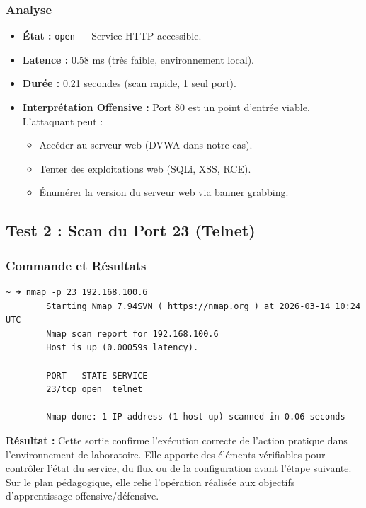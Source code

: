 \documentclass[12pt,a4paper,openany]{report}
\begin{document}
	
	\subsubsection{Analyse}
	\begin{itemize}
		\item \textbf{État :} \texttt{open} --- Service HTTP accessible.
		\item \textbf{Latence :} 0.58 ms (très faible, environnement local).
		\item \textbf{Durée :} 0.21 secondes (scan rapide, 1 seul port).
		\item \textbf{Interprétation Offensive :} Port 80 est un point d'entrée viable. L'attaquant peut :
		\begin{itemize}
			\item Accéder au serveur web (DVWA dans notre cas).
			\item Tenter des exploitations web (SQLi, XSS, RCE).
			\item Énumérer la version du serveur web via banner grabbing.
		\end{itemize}
	\end{itemize}
	
	\subsection{Test 2 : Scan du Port 23 (Telnet)}
	\subsubsection{Commande et Résultats}
	\begin{lstlisting}[caption=Scan Nmap du port Telnet]
		~ ➜ nmap -p 23 192.168.100.6
		Starting Nmap 7.94SVN ( https://nmap.org ) at 2026-03-14 10:24 UTC
		Nmap scan report for 192.168.100.6
		Host is up (0.00059s latency).
		
		PORT   STATE SERVICE
		23/tcp open  telnet
		
		Nmap done: 1 IP address (1 host up) scanned in 0.06 seconds
	\end{lstlisting}
	
	\textbf{Résultat :} Cette sortie confirme l'exécution correcte de l'action pratique dans l'environnement de laboratoire. Elle apporte des éléments vérifiables pour contrôler l'état du service, du flux ou de la configuration avant l'étape suivante. Sur le plan pédagogique, elle relie l'opération réalisée aux objectifs d'apprentissage offensive/défensive.
	
	
\end{document}

